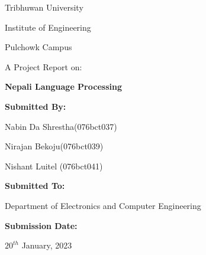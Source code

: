 \bigskip
\bigskip
\bigskip
\bigskip

\begin{center}

Tribhuwan University

Institute of Engineering

Pulchowk Campus

\bigskip
\bigskip
\bigskip
\bigskip
\bigskip
\bigskip
\bigskip
\bigskip

\noindent\makebox[\linewidth]
{\rule{15cm}{0.4pt}}
A Project Report on:

\textbf{\large Nepali Language Processing}
\noindent\makebox[\linewidth]
{\rule{15cm}{0.4pt}}

\bigskip
\bigskip
\bigskip
\bigskip
\bigskip
\bigskip
\bigskip
\bigskip
\textbf{Submitted By:}

Nabin Da Shrestha(076bct037)

Nirajan Bekoju(076bct039)

Nishant Luitel (076bct041)

\bigskip
\bigskip
\bigskip
\bigskip
\textbf{Submitted To:}

Department of Electronics and Computer Engineering

\bigskip
\bigskip
\bigskip
\bigskip
\textbf{Submission Date:} 

$20^{th}$ January, 2023

\end{center}
